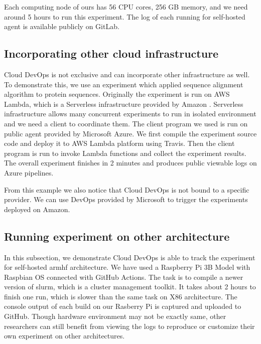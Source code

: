 \documentclass[10pt, conference, compsocconf]{IEEEtran}
\begin{document}
Each computing node of ours has 56 CPU cores, 256 GB memory, and we need around 5 hours to run this experiment. The log of each running for self-hosted agent is available publicly on GitLab.

\subsection{Incorporating other cloud infrastructure}
Cloud DevOps is not exclusive and can incorporate other infrastructure as well.
To demonstrate this, we use
an experiment which applied sequence alignment algorithm to protein sequences.
Originally the experiment is run on AWS Lambda, which is a Serverless infrastructure provided by Amazon \cite{niu2019leveraging}.
Serverless infrastructure allows many concurrent experiments to run in isolated environment and
we need a client to coordinate them. The client program we used is run on public agent provided by Microsoft Azure. We first compile the experiment source code and deploy it to AWS Lambda platform using Travis. Then the client program is run to invoke Lambda functions and collect the experiment results.
The overall experiment finishes in 2 minutes and produces public viewable logs on Azure pipelines. 

From this example we also notice that Cloud DevOps is not bound to a specific provider. We can use DevOps provided by Microsoft to trigger the experiments deployed on Amazon.

\subsection{Running experiment on other architecture}
In this subsection, we demonstrate Cloud DevOps is able to track the experiment for
self-hosted armhf architecture. We have used a Raspberry Pi  3B Model with Raspbian OS connected
with GitHub Actions. The task is to compile a newer version of slurm, which is a cluster management
toolkit. It takes about 2 hours to finish one run, which is slower than the same task on X86 architecture. The console output of each build on our Rasberry Pi is captured and uploaded to GitHub. Though hardware environment may not be exactly same, other researchers can still benefit from viewing the logs to reproduce or customize their own experiment on other architectures.
\end{document}
